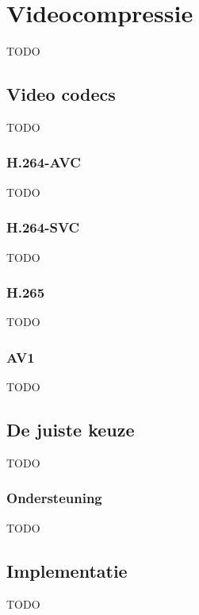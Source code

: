 \chapter{Videocompressie}
\label{ch:videocompressie}

TODO

\section{Video codecs}
\label{sec:videocompressie-video-codecs}

TODO

\subsection{H.264-AVC}
\label{sec:videocompressie-h264-AVC}

TODO

\subsection{H.264-SVC}
\label{sec:videocompressie-h264-SVC}

TODO

\subsection{H.265}
\label{sec:videocompressie-h265}

TODO

\subsection{AV1}
\label{sec:videocompressie-av1}

TODO

\section{De juiste keuze}
\label{sec:videocompressie-keuze}

TODO

\subsection{Ondersteuning}
\label{sec:videocompressie-ondersteuning}

TODO

\section{Implementatie}
\label{sec:videocompressie-implementatie}

TODO

